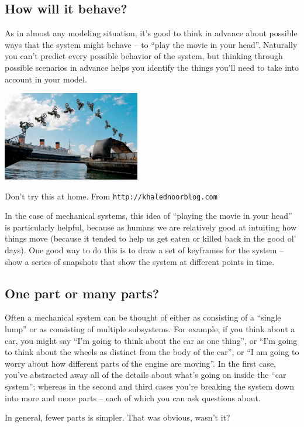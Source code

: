 \documentclass{tufte-handout}
\begin{document}
\subsection{How will it behave?}
As in almost any modeling situation, it's good to think in advance about possible ways that the system might behave -- to ``play the movie in your head''.  Naturally you can't predict every possible behavior of the system, but thinking through possible scenarios in advance helps you identify the things you'll need to take into account in your model.  
\begin{marginfigure}
\includegraphics[width=6cm]{figs/motorcyclekeyframe}
\caption{Don't try this at home.  From {\tt http://khalednoorblog.com}
 }
\end{marginfigure}
In the case of mechanical systems, this idea of ``playing the movie in your head'' is particularly helpful, because as humans we are relatively good at intuiting how things move (because it tended to help us get eaten or killed back in the good ol' days).  One good way to do this is to draw a set of keyframes for the system -- show a series of snapshots that show the system at different points in time.

\subsection{One part or many parts?}
Often a mechanical system can be thought of either as consisting of a ``single lump'' or as consisting of multiple subsystems.  For example, if you think about a car, you might say ``I'm going to think about the car as one thing'', or ``I'm going to think about the wheels as distinct from the body of the car'', or ``I am going to worry about how different parts of the engine are moving''.  In the first case, you've abstracted away all of the details about what's going on inside the ``car system''; whereas in the second and third cases you're breaking the system down into more and more parts -- each of which you can ask questions about.

In general, fewer parts is simpler.  That was obvious, wasn't it?
\end{document}
